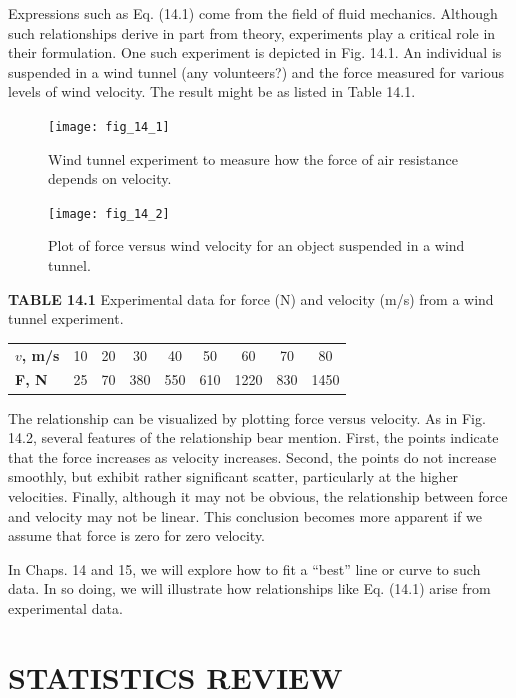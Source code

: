 \documentclass[../main.tex]{subfiles}
\begin{document}
Expressions such as Eq. (14.1) come from the field of fluid mechanics. Although such
relationships derive in part from theory, experiments play a critical role in their formulation. One such experiment is depicted in Fig. 14.1. An individual is suspended in a wind tunnel (any volunteers?) and the force measured for various levels of wind velocity. The
result might be as listed in Table 14.1.

\begin{figure}[H]
	\centering
	\texttt{[image: fig\_14\_1]}
	\caption{\textsf{Wind tunnel experiment to measure how the force of air resistance depends on velocity.}}
	\label{fig:fig_14_1}
\end{figure}

\begin{figure}[H]
	\centering
	\texttt{[image: fig\_14\_2]}
	\caption{\textsf{Plot of force versus wind velocity for an object suspended in a wind tunnel.}}
	\label{fig:fig_14_2}
\end{figure}

\noindent \textbf{TABLE 14.1} Experimental data for force (N) and velocity (m/s) from a wind tunnel
experiment.

\begin{tabular}{l c c c ccccc}
	\textbf{$v$, m/s} & 10 & 20 & 30 & 40 & 50 & 60 & 70 & 80 \\
	\textbf{F, N} & 25 & 70 & 380 & 550 & 610 & 1220 & 830 & 1450
\end{tabular}

The relationship can be visualized by plotting force versus velocity. As in Fig. 14.2,
several features of the relationship bear mention. First, the points indicate that the force
increases as velocity increases. Second, the points do not increase smoothly, but exhibit
rather significant scatter, particularly at the higher velocities. Finally, although it may not
be obvious, the relationship between force and velocity may not be linear. This conclusion
becomes more apparent if we assume that force is zero for zero velocity.

In Chaps. 14 and 15, we will explore how to fit a ``best'' line or curve to such data. In
so doing, we will illustrate how relationships like Eq. (14.1) arise from experimental data.


\label{cha:cha_P_14_1}
\section{STATISTICS REVIEW}
\end{document}
